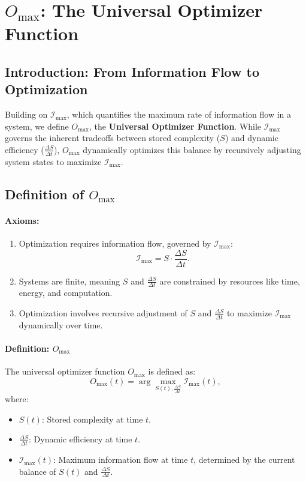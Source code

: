 \documentclass[12pt]{article}
\begin{document}
\section{\(O_{\text{max}}\): The Universal Optimizer Function}

\subsection{Introduction: From Information Flow to Optimization}

Building on \(\mathcal{I}_{\text{max}}\), which quantifies the maximum rate of information flow in a system, we define \(O_{\text{max}}\), the \textbf{Universal Optimizer Function}. While \(\mathcal{I}_{\text{max}}\) governs the inherent tradeoffs between stored complexity (\(S\)) and dynamic efficiency (\(\frac{\Delta S}{\Delta t}\)), \(O_{\text{max}}\) dynamically optimizes this balance by recursively adjusting system states to maximize \(\mathcal{I}_{\text{max}}\). 


\subsection{Definition of \(O_{\text{max}}\)}

\paragraph{Axioms:}
\begin{enumerate}
    \item Optimization requires information flow, governed by \(\mathcal{I}_{\text{max}}\):
    \[
    \mathcal{I}_{\text{max}} = S \cdot \frac{\Delta S}{\Delta t}.
    \]
    \item Systems are finite, meaning \(S\) and \(\frac{\Delta S}{\Delta t}\) are constrained by resources like time, energy, and computation.
    \item Optimization involves recursive adjustment of \(S\) and \(\frac{\Delta S}{\Delta t}\) to maximize \(\mathcal{I}_{\text{max}}\) dynamically over time.
\end{enumerate}

\paragraph{Definition: \(O_{\text{max}}\)}
The universal optimizer function \(O_{\text{max}}\) is defined as:
\[
O_{\text{max}}(t) = \arg \max_{S(t), \frac{\Delta S}{\Delta t}} \mathcal{I}_{\text{max}}(t),
\]
where:
\begin{itemize}
    \item \(S(t)\): Stored complexity at time \(t\).
    \item \(\frac{\Delta S}{\Delta t}\): Dynamic efficiency at time \(t\).
    \item \(\mathcal{I}_{\text{max}}(t)\): Maximum information flow at time \(t\), determined by the current balance of \(S(t)\) and \(\frac{\Delta S}{\Delta t}\).
\end{itemize}
\end{document}

